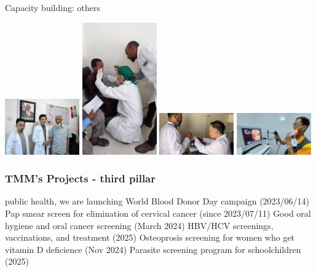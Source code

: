 \documentclass[aspectratio=169]{beamer}
\begin{document}
\begin{frame}{Capacity building: others}
    \begin{center}
        \includegraphics[width=0.24\textwidth]{IMG-5107.JPG}
        \includegraphics[width=0.24\textwidth]{IMG-4703.JPG}
        \includegraphics[width=0.24\textwidth]{IMG-5062.JPG}
        \includegraphics[width=0.24\textwidth]{6a625355-ae53-4e8f-891e-38a933f6c29b.JPG}    
    \end{center}
\end{frame}
\begin{frame}
\frametitle{TMM's Projects - third pillar}
\begin{outline}    
    \1 public health, we are launching
        \2 World Blood Donor Day campaign (2023/06/14)
        \2 Pap smear screen for elimination of cervical cancer (since 2023/07/11)
        \2 Good oral hygiene and oral cancer screening (March 2024)
        \2 HBV/HCV screenings, vaccinations, and treatment (2025)
        \2 Osteoprosis screening for women who get vitamin D deficience (Nov 2024)
        \2 Parasite screening program for schoolchildren (2025)
\end{outline}

\begin{center}





\end{center}

\end{frame}
\end{document}
